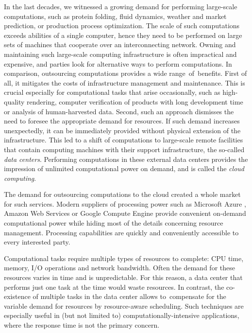 \indent
In the last decades, we witnessed a growing demand for performing large-scale
computations, such as protein folding, fluid dynamics, weather and market prediction, or production process optimization.
The scale of such computations exceeds abilities of a single computer, hence they need to be performed on large sets of machines that cooperate over an interconnecting network.
Owning and maintaining such large-scale computing infrastructure is often impractical and expensive, and parties look for alternative ways to perform computations.
In comparison, outsourcing computations provides a wide range~of~benefits.
First of all, it mitigates the costs of infrastructure management and maintenance.
This is crucial especially for computational tasks that arise occasionally, such as high-quality rendering, computer verification of products with long development time or analysis of human-harvested data.
Second, such an approach dismisses the need to foresee the appropriate demand for resources.
If such demand increases unexpectedly, it can be immediately provided without physical extension of the infrastructure.
This led to a shift of computations to large-scale remote facilities that contain computing machines with their support infrastructure, the so-called \emph{data centers}.
Performing computations in these external data centers provides the impression of unlimited computational power on demand, and is called the \emph{cloud computing}.

The demand for outsourcing computations to the cloud created a whole market for such services.
Modern suppliers of processing power such as Microsoft Azure \cite{url-azure}, Amazon Web Services \cite{url-amazon-ec2} or Google Compute Engine \cite{url-gce} provide convenient on-demand computational power while hiding most of the details concerning resource management.
Processing capabilities are quickly and conveniently accessible to every interested party.

Computational tasks require multiple types of resources to complete: CPU time, memory, I/O operations and network bandwidth.
Often the demand for these resources varies in time and is unpredictable.
For this reason, a data center that performs just one task at the time would waste resources.
In contrast, the co-existence of multiple tasks in the data center allows to~compensate for the variable demand for resources by resource-aware scheduling.
Such techniques are especially useful in (but not limited to) computationally-intensive applications, where the response time is not the primary concern.

